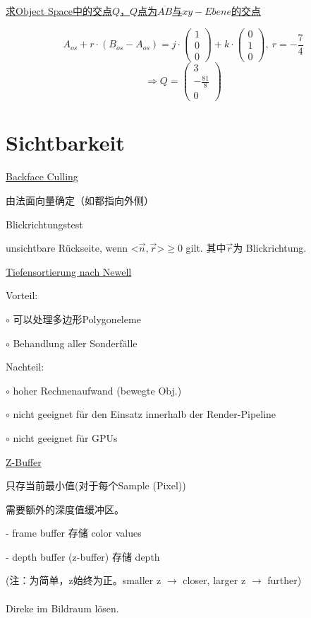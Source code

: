 \documentclass[fleqn]{article}
\begin{document}
\noindent\underline{求Object Space中的交点$Q$，$Q$点为$\overline{AB}$与$xy-Ebene$的交点}

$$A_{os} + r \cdot (B_{os} - A_{os}) = j \cdot \begin{pmatrix} 1 \\ 0 \\ 0 \end{pmatrix} + k\cdot \begin{pmatrix} 0 \\ 1 \\ 0 \end{pmatrix}, \ r = -\frac{7}{4}$$
$$\Rightarrow Q=\begin{pmatrix} 3 \\ -\frac{81}{8} \\ 0 \end{pmatrix}$$

\section{Sichtbarkeit}

\noindent\underline{Backface Culling}

由法面向量确定（如都指向外侧）

\indent\indent Blickrichtungstest

\indent\indent\indent unsichtbare Rückseite, wenn <$\vec{n},\vec{r}$>$\geq 0$ gilt. 其中$\vec{r}$为 Blickrichtung.

\noindent\underline{Tiefensortierung nach Newell}

Vorteil:

$\circ$ 可以处理多边形Polygoneleme

$\circ$ Behandlung aller Sonderfälle

Nachteil:

$\circ$ hoher Rechnenaufwand (bewegte Obj.)

$\circ$ nicht geeignet für den Einsatz innerhalb der Render-Pipeline

$\circ$ nicht geeignet für GPUs

\noindent\underline{Z-Buffer}

只存当前最小值(对于每个Sample (Pixel))

需要额外的深度值缓冲区。

- frame buffer 存储 color values

- depth buffer (z-buffer) 存储 depth

(注：为简单，z始终为正。smaller z $\rightarrow$ closer, larger z $\rightarrow$ further)
\\
\\
\indent Direke im Bildraum lösen.
\end{document}
